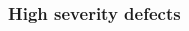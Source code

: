 \subsubsection{High severity defects}
\begin{table}[H]
\footnotesize 
\begin{tabularx}{\textwidth}{| c | P | X | X | P |}
\hline %
 &  &  &  &  \\
\hline %


\end{tabularx}
\end{table}
